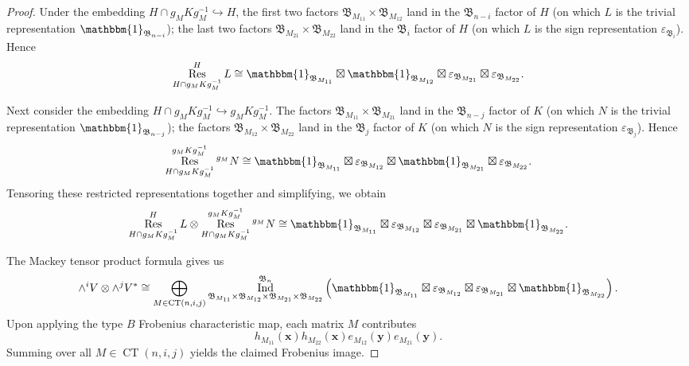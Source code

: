 \documentclass[12pt]{amsart}
\theoremstyle{plain}
\theoremstyle{definition}
\DeclareMathOperator{\Res}{Res}
\DeclareMathOperator{\Ind}{Ind}
\DeclareMathOperator{\CT}{CT}
\begin{document}
\begin{proof}
Under the embedding $H \cap g_M K g_M^{-1} \hookrightarrow H$, the first two factors $\mathfrak{B}_{M_{11}} \times \mathfrak{B}_{M_{12}}$ land in the $\mathfrak{B}_{n-i}$ factor of $H$ (on which $L$ is the trivial representation $\mathbbm{1}_{\mathfrak{B}_{n-i}}$); the last two factors $\mathfrak{B}_{M_{21}} \times \mathfrak{B}_{M_{22}}$ land in the $\mathfrak{B}_{i}$ factor of $H$ (on which $L$ is the sign representation $\varepsilon_{\mathfrak{B}_{i}}$). 
Hence
\begin{equation}
    \Res_{H \cap g_M K g_M^{-1}}^H L \cong \mathbbm{1}_{\mathfrak{B}_{M_{11}}} \boxtimes \mathbbm{1}_{\mathfrak{B}_{M_{12}}} \boxtimes \varepsilon_{\mathfrak{B}_{M_{21}}} \boxtimes \varepsilon_{\mathfrak{B}_{M_{22}}}.
\end{equation}

Next consider the embedding $H \cap g_M K g_M^{-1} \hookrightarrow g_M K g_M^{-1}$. The factors $\mathfrak{B}_{M_{11}} \times \mathfrak{B}_{M_{21}}$ land in the $\mathfrak{B}_{n-j}$ factor of $K$ (on which $N$ is the trivial representation $\mathbbm{1}_{\mathfrak{B}_{n-j}}$); the factors $\mathfrak{B}_{M_{12}} \times \mathfrak{B}_{M_{22}}$ land in the $\mathfrak{B}_{j}$ factor of $K$ (on which $N$ is the sign representation $\varepsilon_{\mathfrak{B}_{j}}$). 
Hence
\begin{equation}
    \Res_{H \cap g_M K g_M^{-1}}^{g_M K g_M^{-1}} {}^{g_M}N \cong \mathbbm{1}_{\mathfrak{B}_{M_{11}}} \boxtimes \varepsilon_{\mathfrak{B}_{M_{12}}} \boxtimes \mathbbm{1}_{\mathfrak{B}_{M_{21}}} \boxtimes \varepsilon_{\mathfrak{B}_{M_{22}}}.
\end{equation}
Tensoring these restricted representations together and simplifying, we obtain
\begin{equation}
    \Res_{H \cap g_M K g_M^{-1}}^H L \otimes \Res_{H \cap g_M K g_M^{-1}}^{g_M K g_M^{-1}} {}^{g_M}N \cong \mathbbm{1}_{\mathfrak{B}_{M_{11}}} \boxtimes \varepsilon_{\mathfrak{B}_{M_{12}}} \boxtimes \varepsilon_{\mathfrak{B}_{M_{21}}} \boxtimes \mathbbm{1}_{\mathfrak{B}_{M_{22}}}.
\end{equation}

The Mackey tensor product formula gives us
\begin{equation}
    \wedge^i V \otimes \wedge^j V^* \cong \bigoplus_{M \in \CT(n,i,j)} \Ind_{\mathfrak{B}_{M_{11}} \times \mathfrak{B}_{M_{12}} \times \mathfrak{B}_{M_{21}} \times \mathfrak{B}_{M_{22}}}^{\mathfrak{B}_n} \left(\mathbbm{1}_{\mathfrak{B}_{M_{11}}} \boxtimes \varepsilon_{\mathfrak{B}_{M_{12}}} \boxtimes \varepsilon_{\mathfrak{B}_{M_{21}}} \boxtimes \mathbbm{1}_{\mathfrak{B}_{M_{22}}}\right).
\end{equation}
Upon applying the type $B$ Frobenius characteristic map, each matrix $M$ contributes
\begin{equation}
    h_{M_{11}}(\mathbf{x}) h_{M_{22}}(\mathbf{x}) e_{M_{12}}(\mathbf{y}) e_{M_{21}}(\mathbf{y}).
\end{equation}
Summing over all $M \in \CT(n,i,j)$ yields the claimed Frobenius image.
\end{proof}
\end{document}
